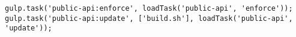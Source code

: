 \begin{verbatim}
gulp.task('public-api:enforce', loadTask('public-api', 'enforce'));
gulp.task('public-api:update', ['build.sh'], loadTask('public-api', 'update'));
\end{verbatim}
